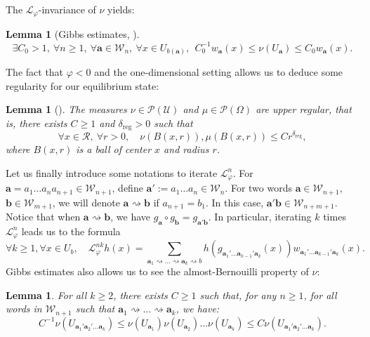 \documentclass[a4paper]{article}
\newtheorem{lemma}[theorem]{Lemma}
\theoremstyle{definition}
\begin{document}
The $\mathcal{L}_\varphi$-invariance of $\nu$ yields:

\begin{lemma}[Gibbs estimates, \cite{PP90}]\label{Gibbs}
$$ \exists C_0>1, \ \forall n \geq 1, \ \forall \mathbf{a} \in \mathcal{W}_n, \  \forall x \in U_{b(\mathbf{a})}, \ \ C_0^{-1} w_\mathbf{a}(x) \leq \nu( U_{\mathbf{a}} ) \leq C_0 w_\mathbf{a}(x) .$$
\end{lemma}

The fact that $\varphi < 0$ and the one-dimensional setting allows us to deduce some regularity for our equilibrium state:

\begin{lemma}[\cite{Le23a}]\label{lem:upreg}
The measures $\nu \in \mathcal{P}(\mathcal{U})$ and $\mu \in \mathcal{P}(\Omega)$ are upper regular, that is, there exists $C\geq1$ and $\delta_{\text{reg}}>0$ such that
$$ \forall x \in \mathcal{R}, \ \forall r > 0, \quad \nu( B(x,r) ),\mu( B(x,r) ) \leq C r^{\delta_{\text{reg}}},$$
where $B(x,r)$ is a ball of center $x$ and radius $r$.
\end{lemma}

Let us finally introduce some notations to iterate $\mathcal{L}_\varphi^n$.  For $\mathbf{a}=a_1 \dots a_n a_{n+1} \in \mathcal{W}_{n+1}$, define $\mathbf{a}' := a_1 \dots a_{n} \in \mathcal{W}_n$.  For two words $\mathbf{a} \in \mathcal{W}_{n+1}$, $\mathbf{b} \in \mathcal{W}_{m+1}$, we will denote $\mathbf{a} \rightsquigarrow \mathbf{b} $ if $a_{n+1}=b_1$. In this case, $\mathbf{a}' \mathbf{b} \in \mathcal{W}_{n+m+1}$. \\

Notice that when $\mathbf{a} \rightsquigarrow \mathbf{b}$, we have $g_\mathbf{a} \circ g_\mathbf{b} = g_{\mathbf{a}'\mathbf{b}}$. In particular, iterating  $k$ times $\mathcal{L}_\varphi^n$ leads us to the formula
$$ \forall k \geq 1,  \forall x \in U_b, \quad  \mathcal{L}_\varphi^{nk} h(x)  = \sum_{\mathbf{a}_1 \rightsquigarrow \dots \rightsquigarrow \mathbf{a}_k \rightsquigarrow b} h(g_{\mathbf{a}_1 ' \dots \mathbf{a}_{k-1} ' \mathbf{a}_k}(x) ) w_{\mathbf{a}_1 ' \dots \mathbf{a}_{k-1} ' \mathbf{a}_k}(x) .$$
Gibbs estimates also allows us to see the almost-Bernouilli property of $\nu$:
\begin{lemma}
For all $k \geq 2$, there exists $C \geq 1$ such that, for any $n \geq 1$, for all words in $\mathcal{W}_{n+1}$ such that $\mathbf{a}_1 \rightsquigarrow \dots \rightsquigarrow \mathbf{a}_k$, we have:
$$ C^{-1} \nu( U_{\mathbf{a}_1' \mathbf{a}_2' \dots \mathbf{a}_k  } )  \leq \nu( U_{\mathbf{a}_1} )\nu( U_{\mathbf{a}_2} ) \dots  \nu( U_{\mathbf{a}_k} ) \leq C \nu( U_{\mathbf{a}_1' \mathbf{a}_2' \dots \mathbf{a}_k  } ) .$$
\end{lemma}
\end{document}
